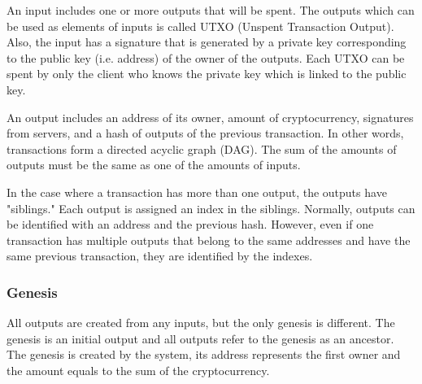 \documentclass[a4paper, oneside]{discothesis}
\begin{document}
An input includes one or more outputs that will be spent.
The outputs which can be used as elements of inputs is called UTXO (Unspent Transaction Output).
Also, the input has a signature that is generated by a private key
corresponding to the public key (i.e. address) of the owner of the outputs.
Each UTXO can be spent by only the client who knows the private key
which is linked to the public key.

An output includes an address of its owner, amount of cryptocurrency, signatures from servers,
and a hash of outputs of the previous transaction.
In other words, transactions form a directed acyclic graph (DAG).
The sum of the amounts of outputs must be the same as one of the amounts of inputs.

In the case where a transaction has more than one output, the outputs have "siblings."
Each output is assigned an index in the siblings.
Normally, outputs can be identified with an address and the previous hash.
However, even if one transaction has multiple outputs that belong to the same addresses
and have the same previous transaction, they are identified by the indexes.


\subsubsection{Genesis}
All outputs are created from any inputs, but the only genesis is different.
The genesis is an initial output and all outputs refer to the genesis as an ancestor.
The genesis is created by the system, its address represents the first owner
and the amount equals to the sum of the cryptocurrency.
\end{document}
